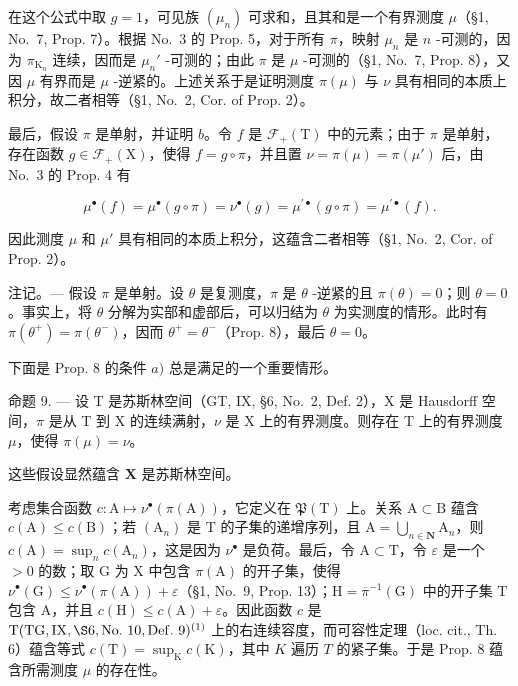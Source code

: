 在这个公式中取 \(g = 1\)，可见族 \((\mu_n)\) 可求和，且其和是一个有界测度 \(\mu\)（§1, No.~7, Prop. 7）。根据 No.~3 的 Prop. 5，对于所有 \(\pi\)，映射 \(\mu_n\) 是 \(n\) -可测的，因为 \(\pi_{\mathrm{K}_n}\) 连续，因而是 \(\mu_n'\) -可测的；由此 \(\pi\) 是 \(\mu\) -可测的（§1, No.~7, Prop. 8），又因 \(\mu\) 有界而是 \(\mu\) -逆紧的。上述关系于是证明测度 \(\pi(\mu)\) 与 \(\nu\) 具有相同的本质上积分，故二者相等（§1, No.~2, Cor. of Prop. 2）。

最后，假设 \(\pi\) 是单射，并证明 \(b\)。令 \(f\) 是 \(\mathcal{F}_{+}(\mathrm{T})\) 中的元素；由于 \(\pi\) 是单射，存在函数 \(g \in \mathcal{F}_{+}(\mathrm{X})\)，使得 \(f = g \circ \pi\)，并且置 \(\nu = \pi(\mu) = \pi(\mu')\) 后，由 No.~3 的 Prop. 4 有

\[
\mu^ {\bullet} (f) = \mu^ {\bullet} (g \circ \pi) = \nu^ {\bullet} (g) = \mu^ {\prime \bullet} (g \circ \pi) = \mu^ {\prime \bullet} (f).
\]

因此测度 \(\mu\) 和 \(\mu'\) 具有相同的本质上积分，这蕴含二者相等（§1, No.~2, Cor. of Prop. 2）。

注记。--- 假设 \(\pi\) 是单射。设 \(\theta\) 是复测度，\(\pi\) 是 \(\theta\) -逆紧的且 \(\pi(\theta)=0\)；则 \(\theta=0\)。事实上，将 \(\theta\) 分解为实部和虚部后，可以归结为 \(\theta\) 为实测度的情形。此时有 \(\pi(\theta^{+})=\pi(\theta^{-})\)，因而 \(\theta^{+}=\theta^{-}\)（Prop. 8），最后 \(\theta=0\)。

下面是 Prop. 8 的条件 \(a)\) 总是满足的一个重要情形。

命题 9. --- 设 T 是苏斯林空间（GT, IX, §6, No.~2, Def. 2），X 是 Hausdorff 空间，\(\pi\) 是从 T 到 X 的连续满射，\(\nu\) 是 X 上的有界测度。则存在 T 上的有界测度 \(\mu\)，使得 \(\pi(\mu) = \nu\)。

这些假设显然蕴含 \(\mathbf{X}\) 是苏斯林空间。

考虑集合函数 \(c: \mathrm{A} \mapsto \nu^{\bullet}(\pi(\mathrm{A}))\)，它定义在 \(\mathfrak{P}(\mathrm{T})\) 上。关系 \(\mathrm{A} \subset \mathrm{B}\) 蕴含 \(c(\mathrm{A}) \leqslant c(\mathrm{B})\)；若 \((\mathrm{A}_n)\) 是 \(\mathrm{T}\) 的子集的递增序列，且 \(\mathrm{A} = \bigcup_{n \in \mathbf{N}} \mathrm{A}_n\)，则 \(c(\mathrm{A}) = \sup_n c(\mathrm{A}_n)\)，这是因为 \(\nu^{\bullet}\) 是负荷。最后，令 \(\mathrm{A} \subset \mathrm{T}\)，令 \(\varepsilon\) 是一个 \(> 0\) 的数；取 \(\mathrm{G}\) 为 \(\mathrm{X}\) 中包含 \(\pi(\mathrm{A})\) 的开子集，使得 \(\nu^{\bullet}(\mathrm{G}) \leqslant \nu^{\bullet}(\pi(\mathrm{A})) + \varepsilon\)（§1, No.~9, Prop. 13）；\(\mathrm{H} = \overline{\pi}^{-1}(\mathrm{G})\) 中的开子集 \(\mathrm{T}\) 包含 \(\mathrm{A}\)，并且 \(c(\mathrm{H}) \leqslant c(\mathrm{A}) + \varepsilon\)。因此函数 \(c\) 是 \(\mathrm{T} (\mathrm{TG},\mathrm{IX},\S 6,\mathrm{No.~10},\mathrm{Def.~9})^{(1)}\) 上的右连续容度，而可容性定理（loc. cit., Th. 6）蕴含等式 \(c(\mathrm{T}) = \sup_{\mathrm{K}}c(\mathrm{K})\)，其中 \(K\) 遍历 \(T\) 的紧子集。于是 Prop. 8 蕴含所需测度 \(\mu\) 的存在性。

